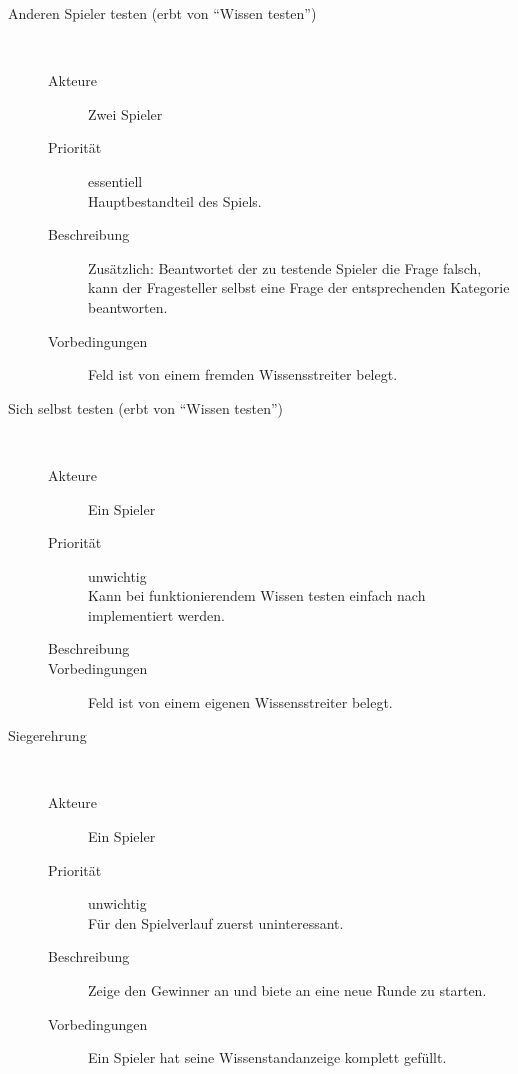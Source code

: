 \documentclass{report}
\begin{document}
\begin{description}
   \item[Anderen Spieler testen (erbt von "`Wissen testen"')]~\par
   \begin{description}
      \item[Akteure] Zwei Spieler
      \item[Priorität] essentiell\\Hauptbestandteil des Spiels.
      \item[Beschreibung] Zusätzlich: Beantwortet der zu testende Spieler die Frage falsch, kann der Fragesteller selbst eine Frage der entsprechenden Kategorie beantworten.
      \item[Vorbedingungen] Feld ist von einem fremden Wissensstreiter belegt.
   \end{description}


   \item[Sich selbst testen (erbt von "`Wissen testen"')]~\par
   \begin{description}
      \item[Akteure] Ein Spieler
      \item[Priorität] unwichtig\\Kann bei funktionierendem Wissen testen einfach nach implementiert werden.
      \item[Beschreibung]
      \item[Vorbedingungen] Feld ist von einem eigenen Wissensstreiter belegt.
   \end{description}


   \item[Siegerehrung]~\par
   \begin{description}
      \item[Akteure] Ein Spieler
      \item[Priorität] unwichtig\\Für den Spielverlauf zuerst uninteressant.
      \item[Beschreibung] Zeige den Gewinner an und biete an eine neue Runde zu starten.
      \item[Vorbedingungen] Ein Spieler hat seine Wissenstandanzeige komplett gefüllt.
   \end{description}
\end{description}
\end{document}
